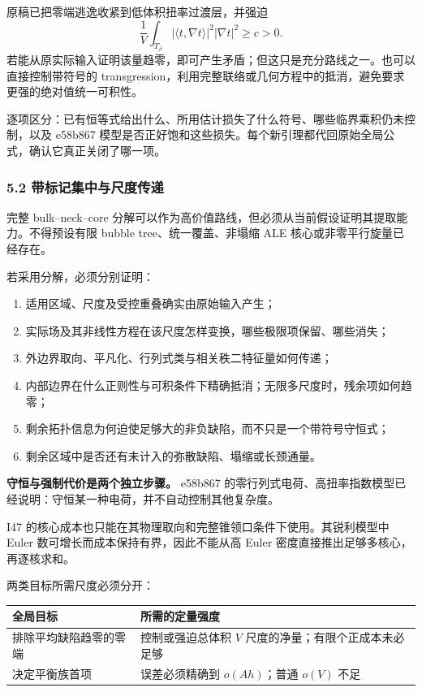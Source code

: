 \documentclass[
  10pt,
]{article}
\providecommand{\tightlist}{%
  \setlength{\itemsep}{0pt}\setlength{\parskip}{0pt}}
\begin{document}
原稿已把零端逃逸收紧到低体积扭率过渡层，并强迫 \[
\frac1V\int_{T_\beta}
|\langle t,\nabla t\rangle|^2|\nabla t|^2\ge c>0.
\]
若能从原实际输入证明该量趋零，即可产生矛盾；但这只是充分路线之一。也可以直接控制带符号的
transgression，利用完整联络或几何方程中的抵消，避免要求更强的绝对值统一可积性。

逐项区分：已有恒等式给出什么、所用估计损失了什么符号、哪些临界乘积仍未控制，以及
e58b867
模型是否正好饱和这些损失。每个新引理都代回原始全局公式，确认它真正关闭了哪一项。

\hypertarget{ux5e26ux6807ux8bb0ux96c6ux4e2dux4e0eux5c3aux5ea6ux4f20ux9012}{%
\subsubsection{5.2
带标记集中与尺度传递}\label{ux5e26ux6807ux8bb0ux96c6ux4e2dux4e0eux5c3aux5ea6ux4f20ux9012}}

完整 bulk--neck--core
分解可以作为高价值路线，但必须从当前假设证明其提取能力。不得预设有限
bubble tree、统一覆盖、非塌缩 ALE 核心或非零平行旋量已经存在。

若采用分解，必须分别证明：

\begin{enumerate}
\def\labelenumi{\arabic{enumi}.}
\tightlist
\item
  适用区域、尺度及受控重叠确实由原始输入产生；
\item
  实际场及其非线性方程在该尺度怎样变换，哪些极限项保留、哪些消失；
\item
  外边界取向、平凡化、行列式类与相关秩二特征量如何传递；
\item
  内部边界在什么正则性与可积条件下精确抵消；无限多尺度时，残余项如何趋零；
\item
  剩余拓扑信息为何迫使足够大的非负缺陷，而不只是一个带符号守恒式；
\item
  剩余区域中是否还有未计入的弥散缺陷、塌缩或长颈通量。
\end{enumerate}

\textbf{守恒与强制代价是两个独立步骤。} e58b867
的零行列式电荷、高扭率指数模型已经说明：守恒某一种电荷，并不自动控制其他复杂度。

I47 的核心成本也只能在其物理取向和完整锥领口条件下使用。其锐利模型中
Euler 数可增长而成本保持有界，因此不能从高 Euler
密度直接推出足够多核心，再逐核求和。

两类目标所需尺度必须分开：

\begin{longtable}[]{@{}>{\raggedright\arraybackslash}p{\dimexpr(\linewidth-2\tabcolsep)/2\relax}>{\raggedright\arraybackslash}p{\dimexpr(\linewidth-2\tabcolsep)/2\relax}@{}}
\toprule
全局目标 & 所需的定量强度\tabularnewline
\midrule
\endhead
排除平均缺陷趋零的零端 & 控制或强迫总体积 \(V\)
尺度的净量；有限个正成本未必足够\tabularnewline
决定平衡族首项 & 误差必须精确到 \(o(Ah)\)；普通 \(o(V)\)
不足\tabularnewline
\bottomrule
\end{longtable}
\end{document}
